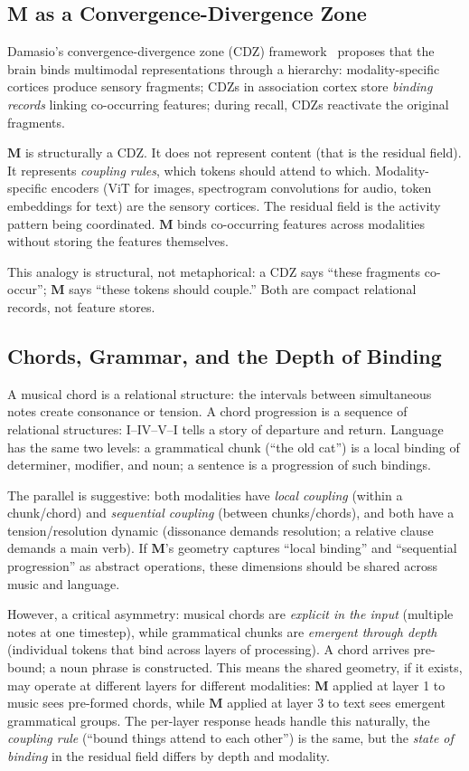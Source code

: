 \documentclass[11pt, a4paper]{article}
\newcommand{\M}{\mathbf{M}}
\theoremstyle{plain}
\theoremstyle{remark}
\begin{document}
\subsection{M as a Convergence-Divergence Zone}

Damasio's convergence-divergence zone (CDZ) framework~\cite{damasio2009cdz} proposes that the brain binds multimodal representations through a hierarchy: modality-specific cortices produce sensory fragments; CDZs in association cortex store \emph{binding records} linking co-occurring features; during recall, CDZs reactivate the original fragments.

$\M$ is structurally a CDZ.
It does not represent content (that is the residual field).
It represents \emph{coupling rules}, which tokens should attend to which.
Modality-specific encoders (ViT for images, spectrogram convolutions for audio, token embeddings for text) are the sensory cortices.
The residual field is the activity pattern being coordinated.
$\M$ binds co-occurring features across modalities without storing the features themselves.

This analogy is structural, not metaphorical: a CDZ says ``these fragments co-occur''; $\M$ says ``these tokens should couple.''
Both are compact relational records, not feature stores.

\subsection{Chords, Grammar, and the Depth of Binding}\label{sec:chords}

A musical chord is a relational structure: the intervals between simultaneous notes create consonance or tension.
A chord progression is a sequence of relational structures: I--IV--V--I tells a story of departure and return.
Language has the same two levels: a grammatical chunk (``the old cat'') is a local binding of determiner, modifier, and noun; a sentence is a progression of such bindings.

The parallel is suggestive: both modalities have \emph{local coupling} (within a chunk/chord) and \emph{sequential coupling} (between chunks/chords), and both have a tension/resolution dynamic (dissonance demands resolution; a relative clause demands a main verb).
If $\M$'s geometry captures ``local binding'' and ``sequential progression'' as abstract operations, these dimensions should be shared across music and language.

However, a critical asymmetry: musical chords are \emph{explicit in the input} (multiple notes at one timestep), while grammatical chunks are \emph{emergent through depth} (individual tokens that bind across layers of processing).
A chord arrives pre-bound; a noun phrase is constructed.
This means the shared geometry, if it exists, may operate at different layers for different modalities: $\M$ applied at layer 1 to music sees pre-formed chords, while $\M$ applied at layer 3 to text sees emergent grammatical groups.
The per-layer response heads handle this naturally, the \emph{coupling rule} (``bound things attend to each other'') is the same, but the \emph{state of binding} in the residual field differs by depth and modality.
\end{document}
